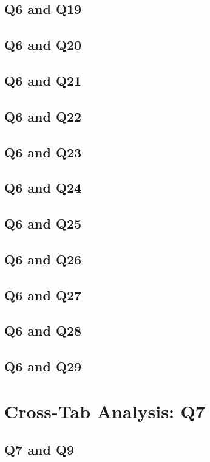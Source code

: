 \documentclass{report}
\begin{document}
\section{Q6 and Q19}\clearpage
\section{Q6 and Q20}\clearpage
\section{Q6 and Q21}\clearpage
\section{Q6 and Q22}\clearpage
\section{Q6 and Q23}\clearpage
\section{Q6 and Q24}\clearpage
\section{Q6 and Q25}\clearpage
\section{Q6 and Q26}\clearpage
\section{Q6 and Q27}\clearpage
\section{Q6 and Q28}\clearpage
\section{Q6 and Q29}\clearpage

\chapter{Cross-Tab Analysis: Q7}

\section{Q7 and Q9}\clearpage
\end{document}
